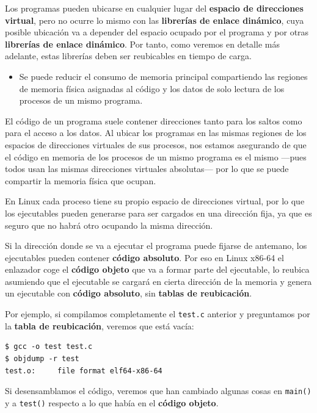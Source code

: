 Los programas pueden ubicarse en cualquier lugar del \textbf{espacio de
direcciones virtual}, pero no ocurre lo mismo con las \textbf{librerías
de enlace dinámico}, cuya posible ubicación va a depender del espacio
ocupado por el programa y por otras \textbf{librerías de enlace
dinámico}. Por tanto, como veremos en detalle más adelante, estas
librerías deben ser reubicables en tiempo de carga.

\begin{itemize}
\item
  Se puede reducir el consumo de memoria principal compartiendo las
  regiones de memoria física asignadas al código y los datos de solo
  lectura de los procesos de un mismo programa.
\end{itemize}

El código de un programa suele contener direcciones tanto para los
saltos como para el acceso a los datos. Al ubicar los programas en las
mismas regiones de los espacios de direcciones virtuales de sus
procesos, nos estamos asegurando de que el código en memoria de los
procesos de un mismo programa es el mismo ---pues todos usan las mismas
direcciones virtuales absolutas--- por lo que se puede compartir la
memoria física que ocupan.

En Linux cada proceso tiene su propio espacio de direcciones virtual,
por lo que los ejecutables pueden generarse para ser cargados en una
dirección fija, ya que es seguro que no habrá otro ocupando la misma
dirección.

Si la dirección donde se va a ejecutar el programa puede fijarse de
antemano, los ejecutables pueden contener \textbf{código absoluto}. Por
eso en Linux x86-64 el enlazador coge el \textbf{código objeto} que va a
formar parte del ejecutable, lo reubica asumiendo que el ejecutable se
cargará en cierta dirección de la memoria y genera un ejecutable con
\textbf{código absoluto}, sin \textbf{tablas de reubicación}.

Por ejemplo, si compilamos completamente el \texttt{test.c} anterior y
preguntamos por la \textbf{tabla de reubicación}, veremos que está
vacía:

\begin{verbatim}
$ gcc -o test test.c
$ objdump -r test
test.o:     file format elf64-x86-64
\end{verbatim}

Si desensamblamos el código, veremos que han cambiado algunas cosas en
\texttt{main()} y a \texttt{test()} respecto a lo que había en el
\textbf{código objeto}.

